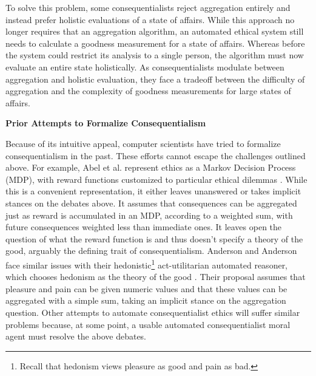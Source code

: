 \begin{isabellebody}
\begin{isamarkuptext}
To solve this problem, some consequentialists reject aggregation entirely and instead prefer holistic
evaluations of a state of affairs. While this approach no longer requires that an 
aggregation algorithm, an automated ethical system still needs to calculate a goodness measurement for a state of 
affairs. Whereas before the system could restrict its analysis to a single person, the algorithm must now 
evaluate an entire state holistically. As consequentialists modulate between aggregation 
and holistic evaluation, they face a tradeoff between the difficulty of aggregation and the complexity 
of goodness measurements for large states of affairs.%
\end{isamarkuptext}\isamarkuptrue%
%
\begin{isamarkuptext}%
\noindent \textbf{Prior Attempts to Formalize Consequentialism}%
\end{isamarkuptext}\isamarkuptrue%
%
\begin{isamarkuptext}%
Because of its intuitive appeal, computer scientists have tried to formalize consequentialism in the past.
These efforts cannot escape the challenges outlined above. For example, Abel et al. represent ethics as a
Markov Decision Process (MDP), with reward functions customized to particular ethical dilemmas 
\citep[3]{util1}. While this is a convenient representation, it either leaves unanswered or 
takes implicit stances on the debates above. It assumes that consequences can be aggregated just as 
reward is accumulated in an MDP, according to a weighted sum, with future consequences weighted less
than immediate ones. It leaves open the question of what the reward function is and thus doesn't 
specify a theory of the good, arguably the defining trait of consequentialism. Anderson and Anderson
face similar issues with their hedonistic\footnote{Recall that hedonism views pleasure as good
and pain as bad.} act-utilitarian automated reasoner, which chooses hedonism as the theory of the good \citep[2]{util2}. 
Their proposal assumes that pleasure and pain can be 
given numeric values and that these values can be aggregated with a simple sum, taking an implicit
stance on the aggregation question. Other attempts to automate consequentialist ethics will suffer 
similar problems because, at some point, a usable automated consequentialist moral agent must
resolve the above debates.%
\end{isamarkuptext}\isamarkuptrue%
%
\isadelimdocument
%
\endisadelimdocument
%
\isatagdocument
%
\isamarkuptrue%

\end{isabellebody}

